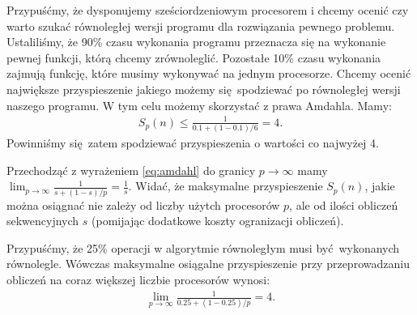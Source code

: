 \begin{przyklad}
Przypuśćmy, że dysponujemy sześciordzeniowym procesorem i chcemy ocenić czy warto szukać równoległej wersji programu dla rozwiązania pewnego problemu. Ustaliliśmy, że 90\% czasu wykonania programu przeznacza się na wykonanie pewnej funkcji, którą chcemy zrównoleglić. Pozostałe 10\% czasu wykonania zajmują funkcję, które musimy wykonywać na jednym procesorze. Chcemy ocenić największe przyspieszenie jakiego możemy się spodziewać po równoległej wersji naszego programu. W tym celu możemy skorzystać z prawa Amdahla. Mamy:
\begin{align*}
S_{p}(n) \leq \frac{1}{0.1 + (1-0.1)/6} = 4.
\end{align*}
\noindent Powinniśmy się zatem spodziewać przyspieszenia o wartości co najwyżej 4.
\end{przyklad}


\begin{wniosek}
Przechodząć z wyrażeniem \eqref{eq:amdahl} do granicy \(p\to\infty\) mamy \(\lim_{p\to\infty}\frac{1}{s+(1-s)/p} = \frac{1}{s}\). Widać, że maksymalne przyspieszenie \(S_{p}(n)\), jakie można osiągnać nie zależy od liczby użytch procesorów \(p\), ale od ilości obliczeń sekwencyjnych \(s\) (pomijając dodatkowe koszty ogranizacji obliczeń).
\end{wniosek}

\begin{przyklad}
Przypuśćmy, że 25\% operacji w algorytmie równoległym musi być wykonanych równolegle. Wówczas maksymalne osiągalne przyspieszenie przy przeprowadzaniu obliczeń na coraz większej liczbie procesorów wynosi:
\begin{align*}
\lim_{p\to \infty} \frac{1}{0.25+(1-0.25)/p} = 4.
\end{align*}
\end{przyklad}


